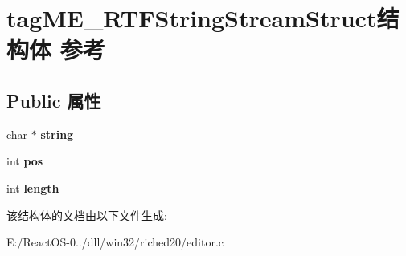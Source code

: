 \hypertarget{structtag_m_e___r_t_f_string_stream_struct}{}\section{tag\+M\+E\+\_\+\+R\+T\+F\+String\+Stream\+Struct结构体 参考}
\label{structtag_m_e___r_t_f_string_stream_struct}
\subsection*{Public 属性}
\begin{DoxyCompactItemize}
\item 
\mbox{\label{structtag_m_e___r_t_f_string_stream_struct_a8bcb26deb8af85d5424866d09b885b34}} 
char $\ast$ {\bfseries string}
\item 
\mbox{\label{structtag_m_e___r_t_f_string_stream_struct_ab7c94428b576f15099eaf768016b7c52}} 
int {\bfseries pos}
\item 
\mbox{\label{structtag_m_e___r_t_f_string_stream_struct_a6406aea9a16cf497b61180e9a14ea66a}} 
int {\bfseries length}
\end{DoxyCompactItemize}


该结构体的文档由以下文件生成\+:\begin{DoxyCompactItemize}
\item 
E\+:/\+React\+O\+S-\/0../dll/win32/riched20/editor.\+c\end{DoxyCompactItemize}
